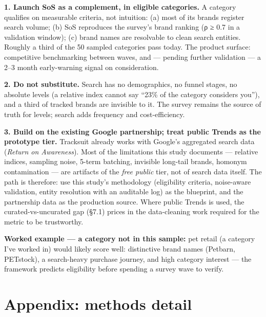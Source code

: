 \documentclass[
]{article}
\begin{document}
\textbf{1. Launch SoS as a complement, in eligible categories.} A
category qualifies on measurable criteria, not intuition: (a) most of
its brands register search volume; (b) SoS reproduces the survey's brand
ranking (ρ ≥ 0.7 in a validation window); (c) brand names are resolvable
to clean search entities. Roughly a third of the 50 sampled categories
pass today. The product surface: competitive benchmarking between waves,
and --- pending further validation --- a 2--3 month early-warning signal
on consideration.

\textbf{2. Do not substitute.} Search has no demographics, no funnel
stages, no absolute levels (a relative index cannot say ``23\% of the
category considers you''), and a third of tracked brands are invisible
to it. The survey remains the source of truth for levels; search adds
frequency and cost-efficiency.

\textbf{3. Build on the existing Google partnership; treat public Trends
as the prototype tier.} Tracksuit already works with Google's aggregated
search data (\emph{Return on Awareness}). Most of the limitations this
study documents --- relative indices, sampling noise, 5-term batching,
invisible long-tail brands, homonym contamination --- are artifacts of
the \emph{free public} tier, not of search data itself. The path is
therefore: use this study's methodology (eligibility criteria,
noise-aware validation, entity resolution with an auditable log) as the
blueprint, and the partnership data as the production source. Where
public Trends is used, the curated-vs-uncurated gap (§7.1) prices in the
data-cleaning work required for the metric to be trustworthy.

\textbf{Worked example --- a category not in this sample:} pet retail (a
category I've worked in) would likely score well: distinctive brand
names (Petbarn, PETstock), a search-heavy purchase journey, and high
category interest --- the framework predicts eligibility before spending
a survey wave to verify.

\hypertarget{appendix-methods-detail}{%
\section*{Appendix: methods detail}\label{appendix-methods-detail}}
\end{document}
